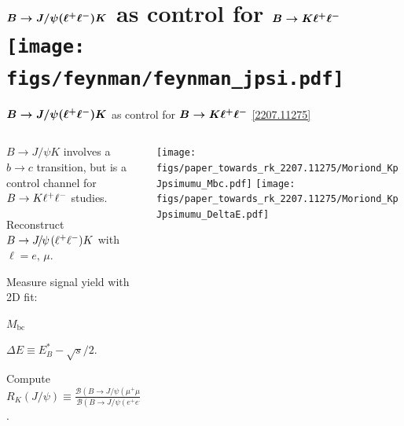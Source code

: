 \section{$\boldsymbol{B \rightarrow J/\psi(\ell^+ \ell^-) K}$ as control for $\boldsymbol{B\rightarrow K\ell^+ \ell^-}$ \\ \hfill \texttt{[image: figs/feynman/feynman\_jpsi.pdf]}}
\begin{frame}{$\boldsymbol{B \rightarrow J/\psi(\ell^+ \ell^-) K}$ as control for $\boldsymbol{B\rightarrow K\ell^+ \ell^-}$ \hfill \href{https://arxiv.org/abs/2207.11275}{[2207.11275]}}
\begin{columns}
\begin{column}{0.6\linewidth}
\bi
\item {\footnotesize $B \to J/\psi K$ involves a $b\to c$ transition, but is a control channel for $B\rightarrow K\ell^+ \ell^-$ studies.}
\item {\footnotesize Reconstruct $B\rightarrow{J\mskip -3mu/\mskip -2mu\psi\mskip 2mu}(\ell^+ \ell^-)K$ with $\ell=e,\,\mu$.}
\item {\footnotesize Measure signal yield with 2D fit:}
\bi
\item {\footnotesize $M_{\mathrm{bc}}$}
\item {\footnotesize $\Delta E \equiv E^*_B - \sqrt{s}/2$.}
\ei
\item {\footnotesize Compute $R_{K}{\left(J/\psi\right)}\equiv \frac{\mathcal{B} \left(B\to J/\psi(\mu^{+}\mu^{-})K\right)}{\mathcal{B} \left(B\to J/\psi(e^{+}e^{-})K\right)}$.}
\ei

\centering
\vspace{0.1cm}
\bi
{}
\ei
\end{column}
\begin{column}{0.4\linewidth}
\texttt{[image: figs/paper\_towards\_rk\_2207.11275/Moriond\_KpJpsimumu\_Mbc.pdf]}
\texttt{[image: figs/paper\_towards\_rk\_2207.11275/Moriond\_KpJpsimumu\_DeltaE.pdf]}
\end{column}
\end{columns}
\end{frame}
